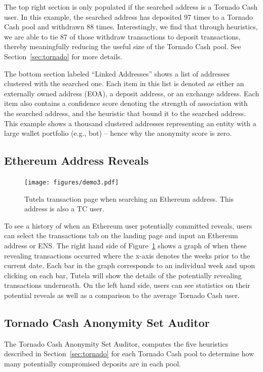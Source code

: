 The top right section is only populated if the searched address is a Tornado Cash user. In this example, the searched address has deposited 97 times to a Tornado Cash pool and withdrawn 88 times. Interestingly, we find that through heuristics, we are able to tie 87 of those withdraw transactions to deposit transactions, thereby meaningfully reducing the useful size of the Tornado Cash pool. See Section~\ref{sec:tornado} for more details.

The bottom section labeled ``Linked Addresses'' shows a list of addresses clustered with the searched one. Each item in this list is denoted as either an externally owned address (EOA), a deposit address, or an exchange address. Each item also contains a confidence score denoting the strength of association with the searched address, and the heuristic that bound it to the searched address.
This example shows a thousand clustered addresses representing an entity with a large wallet portfolio (e.g., bot) -- hence why the anonymity score is zero.

\subsection{Ethereum Address Reveals}

\begin{figure}[h!]
\texttt{[image: figures/demo3.pdf]}
\caption{Tutela transaction page when searching an Ethereum address. This address is also a TC user.}
\label{fig:demo3}
\end{figure}

To see a history of when an Ethereum user potentially committed reveals, users can select the transactions tab on the landing page and input an Ethereum address or ENS. The right hand side of Figure~\ref{fig:demo3} shows a graph of when these revealing transactions occurred where the x-axis denotes the weeks prior to the current date. Each bar in the graph corresponds to an individual week and upon clicking on each bar, Tutela will show the details of the potentially revealing transactions underneath. On the left hand side, users can see statistics on their potential reveals as well as a comparison to the average Tornado Cash user. 


\subsection{Tornado Cash Anonymity Set Auditor}

The Tornado Cash Anonymity Set Auditor, computes the five heuristics described in Section~\ref{sec:tornado} for each Tornado Cash pool to determine how many potentially compromised deposits are in each pool.

